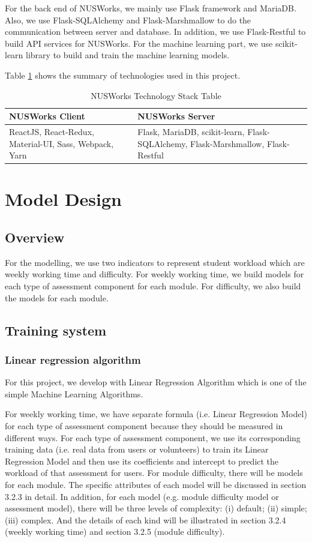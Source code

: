\documentclass[fyp]{socreport}
\begin{document}
For the back end of NUSWorks, we mainly use Flask framework and MariaDB. Also, we use Flask-SQLAlchemy and Flask-Marshmallow to do the communication between server and database. In addition, we use Flask-Restful to build API services for NUSWorks. For the machine learning part, we use scikit-learn library to build and train the machine learning models.

Table {\ref{technology-stack}} shows the summary of technologies used in this project.

\begin{table}[]
\centering
\begin{tabular}{|p{}|p{}|}
\hline
	\rowcolor[HTML]{C0C0C0}
  \textbf{NUSWorks Client} & \textbf{NUSWorks Server} \\
\hline
ReactJS, React-Redux, Material-UI, Sass, Webpack, Yarn & Flask, MariaDB, scikit-learn, Flask-SQLAlchemy, Flask-Marshmallow, Flask-Restful\\
\hline
\end{tabular}
\caption{NUSWorks Technology Stack Table}
\label{technology-stack}
\end{table}

\section{Model Design}
\subsection{Overview}
For the modelling, we use two indicators to represent student workload which are weekly working time and difficulty. For weekly working time, we build models for each type of assessment component for each module. For difficulty, we also build the models for each module.

\subsection{Training system}
\subsubsection{Linear regression algorithm}
For this project, we develop with Linear Regression Algorithm which is one of the simple Machine Learning Algorithms.

For weekly working time, we have separate formula (i.e. Linear Regression Model) for each type of assessment component because they should be measured in different ways. For each type of assessment component, we use its corresponding training data (i.e. real data from users or volunteers) to train its Linear Regression Model and then use its coefficients and intercept to predict the workload of that assessment for users. For module difficulty, there will be models for each module. The specific attributes of each model will be discussed in section 3.2.3 in detail. In addition, for each model (e.g. module difficulty model or assessment model), there will be three levels of complexity: (i) default; (ii) simple; (iii) complex. And the details of each kind will be illustrated in section 3.2.4 (weekly working time) and section 3.2.5 (module difficulty).
\end{document}
